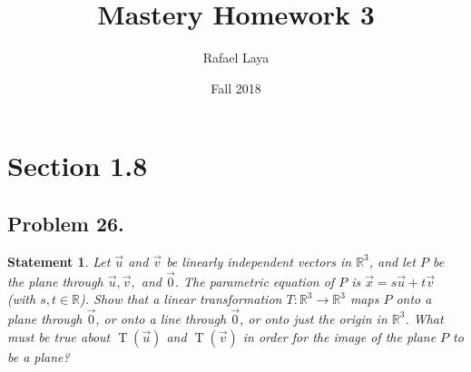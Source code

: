 \documentclass[12pt, letterpaper]{article}
\title{Mastery Homework 3}
\author{Rafael Laya}
\date{Fall 2018}
\newcommand{\R}{\mathbb{R}}
\theoremstyle{statement}
\theoremstyle{statement}
\newtheorem*{atmStat}{Statement}
\begin{document}
    \maketitle

    \section*{Section 1.8}
        \subsection*{Problem 26.} 
        
        \begin{atmStat}
        Let $\Vec{u}$ and $\Vec{v}$ be linearly independent vectors in $\R^3$, and let $P$ be the plane through $\Vec{u}, \Vec{v}, $ and $\Vec{0}$. The parametric equation of $P$ is $\Vec{x} = s\Vec{u} + t\Vec{v}$ (with $s, t \in \R$). Show that a linear transformation $T: \R^3 \longrightarrow \R^3$ maps $P$ onto a plane through $\Vec{0}$, or onto a line through $\Vec{0}$, or onto just the origin in $\R^3$. What must be true about $\operatorname{T}(\Vec{u})$ and $\operatorname{T}(\Vec{v})$ in order for the image of the plane $P$ to be a plane?
        \end{atmStat}
        
\end{document}
